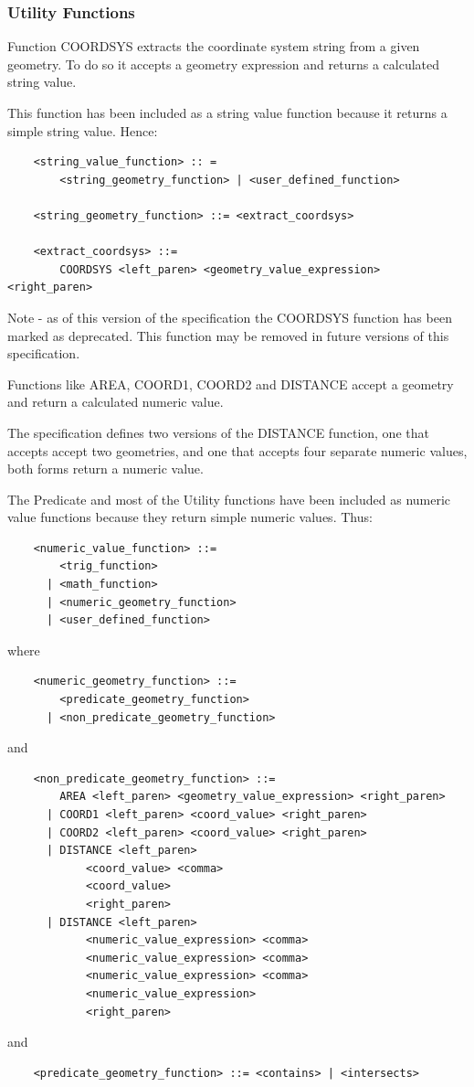 \documentclass[11pt,a4paper]{ivoa}
\begin{document}
\subsubsection{Utility Functions}
\label{sec:functions.geom.utility}

Function COORDSYS extracts the coordinate system string from a given
geometry. To do so it accepts a geometry expression and returns a calculated
string value.

This function has been included as a string value function because it
returns a simple string value.
Hence:
\begin{verbatim}
    <string_value_function> :: =
        <string_geometry_function> | <user_defined_function>

    <string_geometry_function> ::= <extract_coordsys>

    <extract_coordsys> ::=
        COORDSYS <left_paren> <geometry_value_expression> <right_paren>
\end{verbatim}

Note - as of this version of the specification the COORDSYS function has
been marked as deprecated. This function may be removed in future versions
of this specification.

Functions like AREA, COORD1, COORD2 and DISTANCE accept a geometry and
return a calculated numeric value.

The specification defines two versions of the DISTANCE function,
one that accepts accept two geometries, and one that accepts four
separate numeric values, both forms return a numeric value.

The Predicate and most of the Utility functions have been included as numeric
value functions because they return simple numeric values.
Thus:
\begin{verbatim}
    <numeric_value_function> ::=
        <trig_function>
      | <math_function>
      | <numeric_geometry_function>
      | <user_defined_function>
\end{verbatim}
\noindent
where
\begin{verbatim}
    <numeric_geometry_function> ::=
        <predicate_geometry_function>
      | <non_predicate_geometry_function>
\end{verbatim}
\noindent
and
\begin{verbatim}
    <non_predicate_geometry_function> ::=
        AREA <left_paren> <geometry_value_expression> <right_paren>
      | COORD1 <left_paren> <coord_value> <right_paren>
      | COORD2 <left_paren> <coord_value> <right_paren>
      | DISTANCE <left_paren>
            <coord_value> <comma>
            <coord_value>
            <right_paren>
      | DISTANCE <left_paren>
            <numeric_value_expression> <comma>
            <numeric_value_expression> <comma>
            <numeric_value_expression> <comma>
            <numeric_value_expression>
            <right_paren>
\end{verbatim}
\noindent
and
\begin{verbatim}
    <predicate_geometry_function> ::= <contains> | <intersects>
\end{verbatim}
\end{document}
